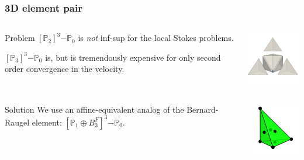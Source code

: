 \documentclass[presentation]{beamer}
\newcommand{\PtwothreePzero}{\ensuremath{[\mathbb{P}_2]^3\mathrm{-}\mathbb{P}_0}\xspace}
\newcommand{\PthreePzero}{\ensuremath{[\mathbb{P}_3]^3\mathrm{-}\mathbb{P}_0}\xspace}
\newcommand{\BR}{\ensuremath{\left[\mathbb{P}_1 \oplus B^F_3\right]}\xspace}
\newcommand{\BRzero}{\ensuremath{\BR^3\mathrm{-}\mathbb{P}_0}\xspace}
\begin{document}
\begin{frame}
  \frametitle{3D element pair}
  \begin{columns}
    \begin{column}{0.6\textwidth}
      \begin{block}{Problem}
        $\PtwothreePzero$ is \emph{not} inf-sup for the local Stokes problems.

        $\PthreePzero$ is, but is tremendously expensive for only
        second order convergence in the velocity.
      \end{block}
    \end{column}
    \begin{column}{0.38\textwidth}
      \begin{center}
        \includegraphics[width=3.5cm]{exploded_tet}
      \end{center}
    \end{column}
  \end{columns}

  \begin{columns}
    \begin{column}{0.6\textwidth}
      \begin{block}{Solution}
        We use an affine-equivalent analog of the Bernard-Raugel
        element: $\BRzero$.
      \end{block}
    \end{column}
    \begin{column}{0.38\textwidth}
      \begin{center}
        \includegraphics[width=3cm]{P1FB}
      \end{center}
    \end{column}
  \end{columns}
\end{frame}
\end{document}

